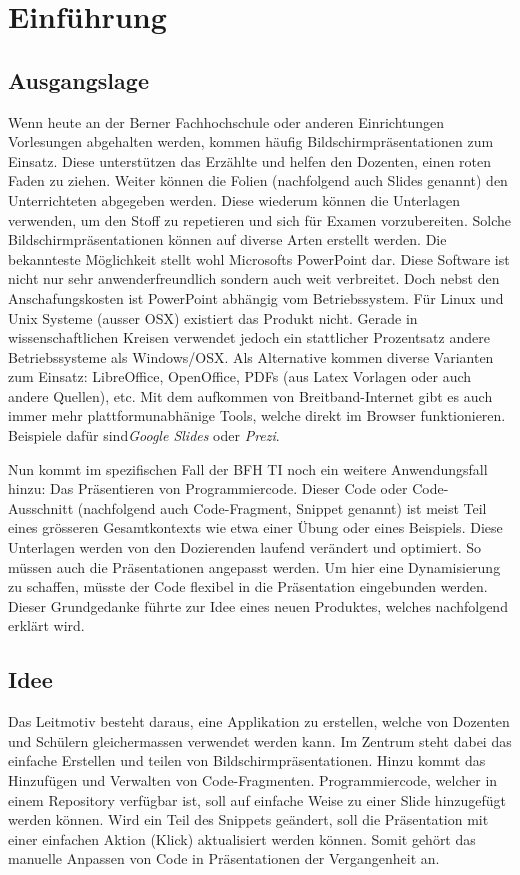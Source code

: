 \chapter{Einführung}
\label{chap:intro}

\section{Ausgangslage}
Wenn heute an der Berner Fachhochschule oder anderen Einrichtungen Vorlesungen abgehalten werden, kommen häufig Bildschirmpräsentationen zum Einsatz. Diese unterstützen das Erzählte und helfen den Dozenten, einen roten Faden zu ziehen. Weiter können die Folien (nachfolgend auch Slides genannt) den Unterrichteten abgegeben werden. Diese wiederum können die Unterlagen verwenden, um den Stoff zu repetieren und sich für Examen vorzubereiten. Solche Bildschirmpräsentationen können auf diverse Arten erstellt werden. Die bekannteste Möglichkeit stellt wohl Microsofts PowerPoint dar. Diese Software ist nicht nur sehr anwenderfreundlich sondern auch weit verbreitet. Doch nebst den Anschafungskosten ist PowerPoint abhängig vom Betriebssystem. Für Linux und Unix Systeme (ausser OSX) existiert das Produkt nicht. Gerade in wissenschaftlichen Kreisen verwendet jedoch ein stattlicher Prozentsatz andere Betriebssysteme als Windows/OSX. Als Alternative kommen diverse Varianten zum Einsatz: LibreOffice, OpenOffice, PDFs (aus Latex Vorlagen oder auch andere Quellen), etc. Mit dem aufkommen von Breitband-Internet gibt es auch immer mehr plattformunabhänige Tools, welche direkt im Browser funktionieren. Beispiele dafür sind\emph{Google Slides} oder \emph{Prezi}. 

Nun kommt im spezifischen Fall der BFH TI noch ein weitere Anwendungsfall hinzu: Das Präsentieren von Programmiercode. Dieser Code oder Code-Ausschnitt (nachfolgend auch Code-Fragment, Snippet genannt) ist meist Teil eines grösseren Gesamtkontexts wie etwa einer Übung oder eines Beispiels. Diese Unterlagen werden von den Dozierenden laufend verändert und optimiert. So müssen auch die Präsentationen angepasst werden. Um hier eine Dynamisierung zu schaffen, müsste der Code flexibel in die Präsentation eingebunden werden. Dieser Grundgedanke führte zur Idee eines neuen Produktes, welches nachfolgend erklärt wird.

\section{Idee}
Das Leitmotiv besteht daraus, eine Applikation zu erstellen, welche von Dozenten und Schülern gleichermassen verwendet werden kann. Im Zentrum steht dabei das einfache Erstellen und teilen von Bildschirmpräsentationen. Hinzu kommt das Hinzufügen und Verwalten von Code-Fragmenten. Programmiercode, welcher in einem Repository verfügbar ist, soll auf einfache Weise zu einer Slide hinzugefügt werden können. Wird ein Teil des Snippets geändert, soll die Präsentation mit einer einfachen Aktion (Klick) aktualisiert werden können. Somit gehört das manuelle Anpassen von Code in Präsentationen der Vergangenheit an. 

